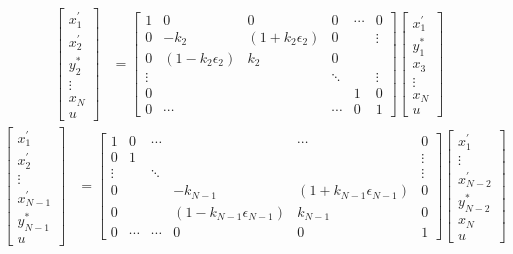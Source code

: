 \documentclass[a4paper,twoside,10pt,english]{report}
\begin{document}
\begin{align*}
\left[\begin{array}{c}
x_{1}^{\prime}\\
x_{2}^{\prime}\\
y_{2}^{*}\\
\vdots\\
x_{N}\\     
u
\end{array}\right] & = \left[\begin{array}{cccccc}
1 & 0 & 0 & 0 & \cdots & 0\\
0 & -k_{2} & \left(1+k_{2}\epsilon_{2}\right) & 0 &  & \vdots\\
0 & \left(1-k_{2}\epsilon_{2}\right) & k_{2} & 0\\
\vdots &  &  & \ddots &  & \vdots\\
0 &  &  &  & 1 & 0\\
0 & \cdots &  & \cdots & 0 & 1
\end{array}\right]\left[\begin{array}{c}
x_{1}^{\prime}\\
y_{1}^{*}\\
x_{3}\\
\vdots\\
x_{N}\\
u
\end{array}\right]
\end{align*}
\begin{align*}
\left[\begin{array}{c}
x_{1}^{\prime}\\
x_{2}^{\prime}\\
\vdots\\
x_{N-1}^{\prime}\\
y_{N-1}^{*}\\
u
\end{array}\right] & = \left[\begin{array}{cccccc}
1 & 0 & \cdots &  & \cdots & 0\\
0 & 1 &  &  &  & \vdots\\
\vdots &  & \ddots &  &  & \vdots\\
0 &  &  & -k_{N-1} & \left(1+k_{N-1}\epsilon_{N-1}\right) & 0\\
0 &  &  & \left(1-k_{N-1}\epsilon_{N-1}\right) & k_{N-1} & 0\\
0 & \cdots & \cdots & 0 & 0 & 1
\end{array}\right]\left[\begin{array}{c}
x_{1}^{\prime}\\
\vdots\\
x_{N-2}^{\prime}\\
y_{N-2}^{*}\\
x_{N}\\
u
\end{array}\right]
\end{align*}
\end{document}
